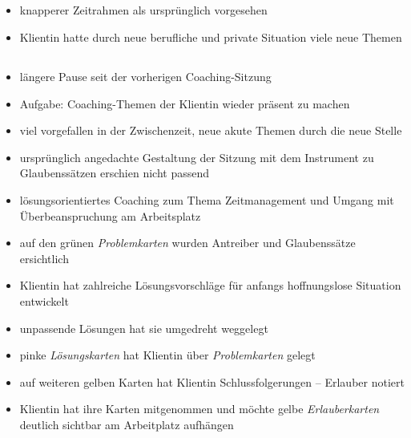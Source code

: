 \documentclass[11pt,a4paper]{article}
\begin{document}
\subsection*{\color{Orange}{Dritte Sitzung: Trichtern mit Fragen für die Überprüfung der Ziele}}



\begin{itemize}

	\item knapperer Zeitrahmen als ursprünglich vorgesehen

	\item Klientin hatte durch neue berufliche und private Situation viele neue Themen

\end{itemize}


\subsection*{\color{Orange}{Vierte Sitzung: Lösungsorientiertes Coaching}}


\begin{itemize}

	
	\item längere Pause seit der vorherigen Coaching-Sitzung
	
	\item Aufgabe: Coaching-Themen der Klientin wieder präsent zu machen
	
	\item viel vorgefallen in der Zwischenzeit, neue akute Themen durch die neue Stelle
	
	\item ursprünglich angedachte Gestaltung der Sitzung mit dem Instrument zu Glaubenssätzen erschien nicht passend
	
	\item lösungsorientiertes Coaching zum Thema Zeitmanagement und Umgang mit Überbeanspruchung am Arbeitsplatz
	
	\item auf den grünen \textsl{Problemkarten} wurden Antreiber und Glaubenssätze ersichtlich
	
	\item Klientin hat zahlreiche Lösungsvorschläge für anfangs hoffnungslose Situation entwickelt
	
	\item unpassende Lösungen hat sie umgedreht weggelegt	
	
	\item pinke \textsl{Lösungskarten} hat Klientin über \textsl{Problemkarten} gelegt
	
	\item auf weiteren gelben Karten hat Klientin Schlussfolgerungen -- Erlauber notiert
	
	\item Klientin hat ihre Karten mitgenommen und möchte gelbe \textsl{Erlauberkarten} deutlich sichtbar am Arbeitplatz aufhängen


\end{itemize}
\end{document}
